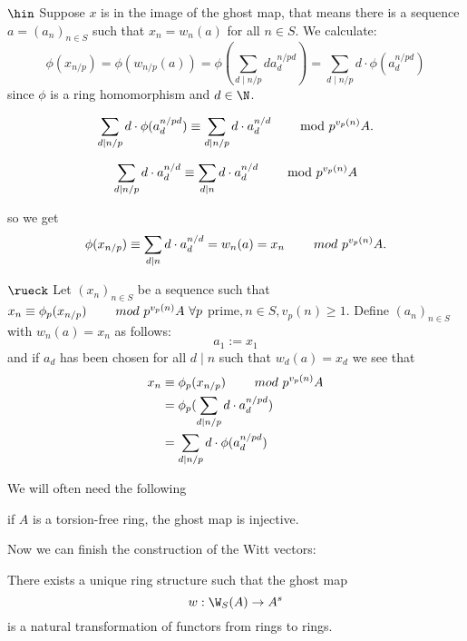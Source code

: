 \begin{bigproof}
    $\hin$ Suppose $x$ is in the image of the ghost map, that means there is a sequence 
    $a = (a_n)_{n \in S}$ such that $x_n = w_n(a)$ for all $n \in S$. 
    We calculate:
    \[
        \phi(x_{n/p}) = \phi(w_{n/p}(a)) = \phi(\sum_{d \mid n/p} d a_d^{n/pd}) =
        \sum_{d \mid n/p} d \cdot \phi(a_d^{n/pd}) 
    \] 
    since $\phi$ is a ring homomorphism and $d \in \N$.
    \begin{claim}
        \[
        \sum_{d \mid n/p} d \cdot \phi(a_d^{n/pd}) \equiv 
        \sum_{d \mid n/p} d \cdot a_d^{n/d} \text{\hskip8mm mod} \  p^{v_p(n)}A.
        \]
    \end{claim}
    \begin{smallproof}
        \todo{}
    \end{smallproof}
    
    \begin{claim}
        \[
        \sum_{d \mid n/p} d \cdot a_d^{n/d} \equiv 
        \sum_{d \mid n} d \cdot a_d^{n/d} \text{\hskip8mm mod} \ p^{v_p(n)}A
        \]
    \end{claim} 
    \begin{smallproof}
        \todo{}
    \end{smallproof}
    so we get
    \[
        \phi(x_{n/p}) \equiv \sum_{d \mid n} d \cdot a_d^{n/d} = w_n(a) = x_n \hskip8mm mod \ p^{v_p(n)}A.
        \]
    
    $\rueck$ Let $(x_n)_{n \in S}$ be a sequence such that 
    $x_n \equiv \phi_p(x_{n/p}) \hskip8mm mod \ p^{v_p(n)}A \ \forall p\ $prime$, n\in S, v_p(n) \geqslant 1.$
    Define $(a_n)_{n \in S}$ with $w_n(a) = x_n$ as follows:
    \[a_1 := x_1\]
    and if $a_d$ has been chosen for all $d \mid n$ such that $w_d(a) = x_d$ we see that
    \begin{align*}
            x_n &\equiv \phi_p(x_{n/p}) \hskip8mm mod \ p^{v_p(n)}A \\
                &= \phi_p(\sum_{d \mid n/p} d \cdot a_d^{n/pd}) \\
                &= \sum_{d \mid n/p} d \cdot \phi(a_d^{n/pd})
    \end{align*}
\end{bigproof}
We will often need the following
\begin{lemma} \label{lem: injective ghost map}
    if $A$ is a torsion-free ring, the ghost map is injective.
\end{lemma}
Now we can finish the construction of the Witt vectors:
\begin{theorem} \label{thm: existence of witt vectors}
    There exists a unique ring structure such that the ghost map 
    \[
      w:\W_S(A) \to A^s  
    \]
    is a natural transformation of functors from rings to rings.
\end{theorem}

